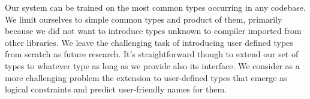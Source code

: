 \documentclass[sigplan,10pt,anonymous]{acmart} %
\theoremstyle{plain}
\theoremstyle{remark}
\theoremstyle{definition}
\begin{document}
Our system can be trained on the most common types occurring in any codebase.
%
We limit ourselves to simple common types and product of them, primarily because we did not want to introduce types unknown to compiler imported from other libraries.
%
We leave the challenging task of introducing user defined types from scratch as future research. It's straightforward though to extend our set of types to whatever type as long as we provide also its interface. We consider as a more challenging problem the extension to user-defined types that emerge as logical constraints and predict user-friendly names for them.




%


\end{document}
